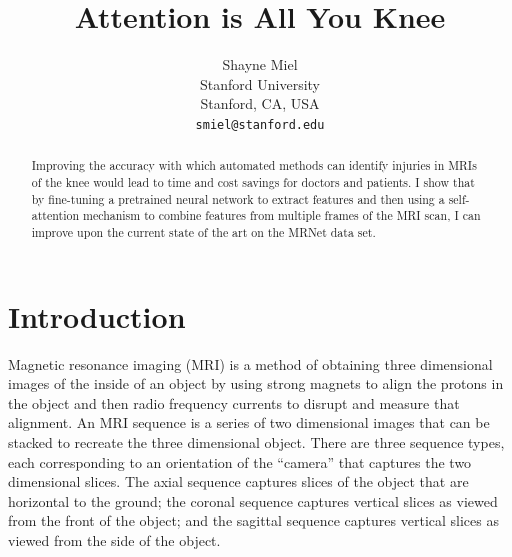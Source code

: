 \documentclass[10pt,twocolumn,letterpaper]{article}
\begin{document}
\title{Attention is All You Knee}

\author{Shayne Miel\\
Stanford University\\
Stanford, CA, USA\\
{\tt\small smiel@stanford.edu}
}

\maketitle

\begin{abstract}
   Improving the accuracy with which automated methods can identify injuries in
   MRIs of the knee would lead to time and cost savings for doctors and patients.
   I show that by fine-tuning a pretrained neural network to extract features
   and then using a self-attention mechanism to combine features from multiple
   frames of the MRI scan, I can improve upon the current state of the art on
   the MRNet data set.
\end{abstract}

\section{Introduction} %

Magnetic resonance imaging (MRI) is a method of obtaining three dimensional images of the inside of an object by using strong magnets to align the protons in the object and then radio frequency currents to disrupt and measure that alignment. An MRI sequence is a series of two dimensional images that can be stacked to recreate the three dimensional object. There are three sequence types, each corresponding to an orientation of the ``camera'' that captures the two dimensional slices. The axial sequence captures slices of the object that are horizontal to the ground; the coronal sequence captures vertical slices as viewed from the front of the object; and the sagittal sequence captures vertical slices as viewed from the side of the object.
\end{document}
